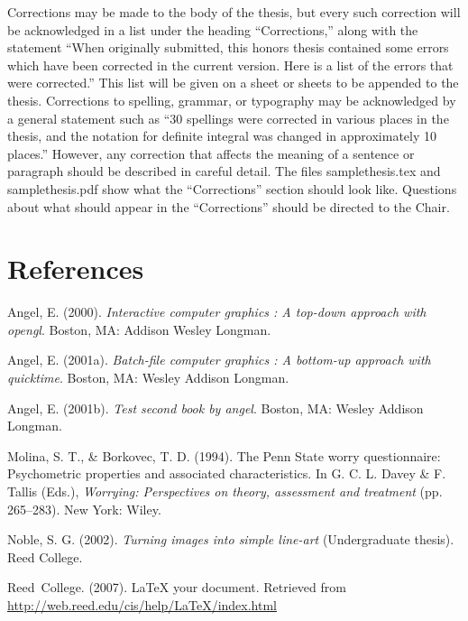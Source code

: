 \documentclass[12pt, twoside]{amherstthesis}
\theoremstyle{definition}
\theoremstyle{definition}
\theoremstyle{definition}
\theoremstyle{remark}
\begin{document}
Corrections may be made to the body of the thesis, but every such correction will be acknowledged in a list under the heading ``Corrections,'' along with the statement ``When originally submitted, this honors thesis contained some errors which have been corrected in the current version. Here is a list of the errors that were corrected.'' This list will be given on a sheet or sheets to be appended to the thesis. Corrections to spelling, grammar, or typography may be acknowledged by a general statement such as ``30 spellings were corrected in various places in the thesis, and the notation for definite integral was changed in approximately 10 places.'' However, any correction that affects the meaning of a sentence or paragraph should be described in careful detail. The files samplethesis.tex and samplethesis.pdf show what the ``Corrections'' section should look like. Questions about what should appear in the ``Corrections'' should be directed to the Chair.

\backmatter

\hypertarget{references}{%
\chapter*{References}\label{references}}

\noindent

\setlength{\parindent}{-0.20in}
\setlength{\leftskip}{0.20in}
\setlength{\parskip}{8pt}

\hypertarget{refs}{}
\leavevmode\hypertarget{ref-angel2000}{}%
Angel, E. (2000). \emph{Interactive computer graphics : A top-down approach with opengl}. Boston, MA: Addison Wesley Longman.

\leavevmode\hypertarget{ref-angel2001}{}%
Angel, E. (2001a). \emph{Batch-file computer graphics : A bottom-up approach with quicktime}. Boston, MA: Wesley Addison Longman.

\leavevmode\hypertarget{ref-angel2002a}{}%
Angel, E. (2001b). \emph{Test second book by angel}. Boston, MA: Wesley Addison Longman.

\leavevmode\hypertarget{ref-Molina1994}{}%
Molina, S. T., \& Borkovec, T. D. (1994). The Penn State worry questionnaire: Psychometric properties and associated characteristics. In G. C. L. Davey \& F. Tallis (Eds.), \emph{Worrying: Perspectives on theory, assessment and treatment} (pp. 265--283). New York: Wiley.

\leavevmode\hypertarget{ref-noble2002}{}%
Noble, S. G. (2002). \emph{Turning images into simple line-art} (Undergraduate thesis). Reed College.

\leavevmode\hypertarget{ref-reedweb2007}{}%
Reed~College. (2007). LaTeX your document. Retrieved from \url{http://web.reed.edu/cis/help/LaTeX/index.html}

\end{document}
